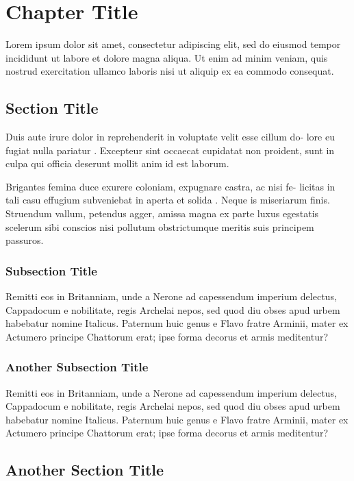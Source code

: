 \chapter{Chapter Title}

Lorem ipsum dolor sit amet, consectetur adipiscing elit, sed do eiusmod tempor incididunt ut labore et dolore magna aliqua. Ut enim ad minim veniam, quis nostrud exercitation ullamco laboris nisi ut aliquip ex ea commodo consequat.

\section{Section Title}

Duis aute irure dolor in reprehenderit in voluptate velit esse cillum do- lore eu fugiat nulla pariatur \cite{foo}. Excepteur sint occaecat cupidatat non proident, sunt in culpa qui officia deserunt mollit anim id est laborum.

Brigantes femina duce exurere coloniam, expugnare castra, ac nisi fe- licitas in tali casu effugium subveniebat in aperta et solida \cite{bar}. Neque is miseriarum finis. Struendum vallum, petendus agger, amissa magna ex parte luxus egestatis scelerum sibi conscios nisi pollutum obstrictumque meritis suis principem passuros.

\subsection{Subsection Title}

Remitti eos in Britanniam, unde a Nerone ad capessendum imperium delectus, Cappadocum e nobilitate, regis Archelai nepos, sed quod diu obses apud urbem habebatur nomine Italicus. Paternum huic genus e Flavo fratre Arminii, mater ex Actumero principe Chattorum erat; ipse forma decorus et armis meditentur?

\subsection{Another Subsection Title}

Remitti eos in Britanniam, unde a Nerone ad capessendum imperium delectus, Cappadocum e nobilitate, regis Archelai nepos, sed quod diu obses apud urbem habebatur nomine Italicus. Paternum huic genus e Flavo fratre Arminii, mater ex Actumero principe Chattorum erat; ipse forma decorus et armis meditentur?

\section{Another Section Title}

